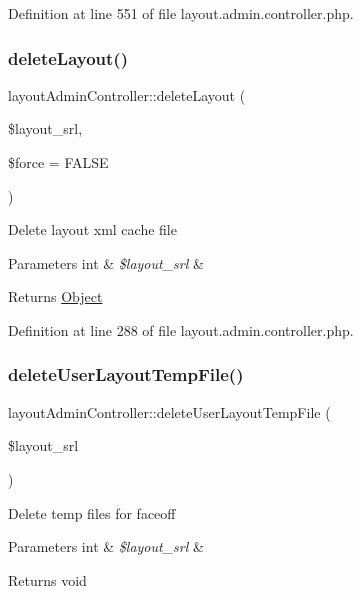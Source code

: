 Definition at line 551 of file layout.\+admin.\+controller.\+php.

\hypertarget{classlayoutAdminController_a2e6e041059b08e3050ebf0f9fd0630bb}{}\label{classlayoutAdminController_a2e6e041059b08e3050ebf0f9fd0630bb} 
\subsubsection{\texorpdfstring{delete\+Layout()}{deleteLayout()}}
{\footnotesize\ttfamily layout\+Admin\+Controller\+::delete\+Layout (\begin{DoxyParamCaption}\item[{}]{\$layout\+\_\+srl,  }\item[{}]{\$force = {\ttfamily FALSE} }\end{DoxyParamCaption})}

Delete layout xml cache file 
\begin{DoxyParams}[1]{Parameters}
int & {\em \$layout\+\_\+srl} & \\
\hline
\end{DoxyParams}
\begin{DoxyReturn}{Returns}
\hyperlink{classObject}{Object} 
\end{DoxyReturn}


Definition at line 288 of file layout.\+admin.\+controller.\+php.

\hypertarget{classlayoutAdminController_a993e68df95066c306c09b550ac705b1e}{}\label{classlayoutAdminController_a993e68df95066c306c09b550ac705b1e} 
\subsubsection{\texorpdfstring{delete\+User\+Layout\+Temp\+File()}{deleteUserLayoutTempFile()}}
{\footnotesize\ttfamily layout\+Admin\+Controller\+::delete\+User\+Layout\+Temp\+File (\begin{DoxyParamCaption}\item[{}]{\$layout\+\_\+srl }\end{DoxyParamCaption})}

Delete temp files for faceoff 
\begin{DoxyParams}[1]{Parameters}
int & {\em \$layout\+\_\+srl} & \\
\hline
\end{DoxyParams}
\begin{DoxyReturn}{Returns}
void 
\end{DoxyReturn}


